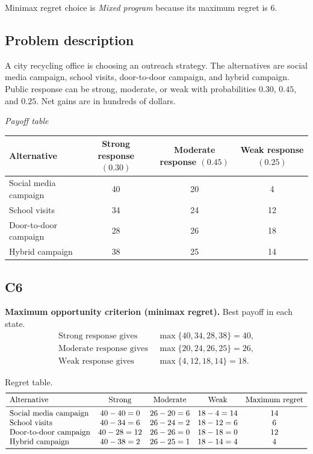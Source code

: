 \begin{ExamProblems}
		Minimax regret choice is \emph{Mixed program} because its maximum regret is $6$.

		\item
		\subsection*{Problem description}
		A city recycling office is choosing an outreach strategy. The alternatives are social media campaign, school visits, door-to-door campaign, and hybrid campaign. Public response can be strong, moderate, or weak with probabilities $0.30$, $0.45$, and $0.25$. Net gains are in hundreds of dollars.

		\begin{center}
			\textit{Payoff table}\\
			\begin{tabular}{l c c c}
				\toprule
				Alternative & Strong response $(0.30)$ & Moderate response $(0.45)$ & Weak response $(0.25)$ \\
				\midrule
				Social media campaign & 40 & 20 & 4 \\
				School visits & 34 & 24 & 12 \\
				Door-to-door campaign & 28 & 26 & 18 \\
				Hybrid campaign & 38 & 25 & 14 \\
				\bottomrule
			\end{tabular}
		\end{center}

		\subsection*{C6}
		\textbf{Maximum opportunity criterion (minimax regret).} Best payoff in each state.
		\[
		\begin{aligned}
		\text{Strong response gives } &\max\{40,34,28,38\}=40,\\
		\text{Moderate response gives } &\max\{20,24,26,25\}=26,\\
		\text{Weak response gives } &\max\{4,12,18,14\}=18.
		\end{aligned}
		\]

		Regret table.
		\[
		\begin{array}{lcccc}
			\toprule
			\text{Alternative} & \text{Strong} & \text{Moderate} & \text{Weak} & \text{Maximum regret}\\
			\midrule
			\text{Social media campaign} & 40-40=0 & 26-20=6 & 18-4=14 & 14\\
			\text{School visits} & 40-34=6 & 26-24=2 & 18-12=6 & 6\\
			\text{Door-to-door campaign} & 40-28=12 & 26-26=0 & 18-18=0 & 12\\
			\text{Hybrid campaign} & 40-38=2 & 26-25=1 & 18-14=4 & 4\\
			\bottomrule
		\end{array}
		\]


\end{ExamProblems}
